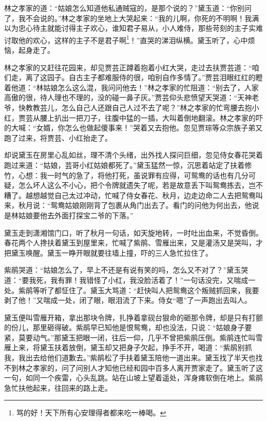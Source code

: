 \documentclass[12pt,oneside]{book}
\begin{document}
林之孝家的道：“姑娘怎么知道他私通贼寇的，是那个说的？”黛玉道：“你别问了，我不会说的。”林之孝家的坐地上大哭起来：“我的儿啊，你死的不明啊！我满以为忠心待主就能讨得主子欢心，谁知君子易从，小人难侍，那些苛刻的主子实难讨取他的欢心，这样的主子不是君子啊\footnote{骂的好！天下所有心安理得者都来吃一棒喝。}！”直哭的涕泪纵横。黛玉听了，心中烦恼，起身走了。

林之孝家的又赶往花园来，却见贾芸正蹲着抱着小红大哭，走过去扶贾芸道：“咱们走，离了这园子。自古主子都难服侍的很，咱别自作多情了。”贾芸泪眼红红的瞪着他道：“林姑娘怎么这么混，我问问他去！”林之孝家的忙阻道：“别去了，人家高傲的很，待人理也不理的，没的碰一鼻子灰。”贾芸仰头悲愤望天哭道：“天神老爷，快教教芸儿，怎么自己人还跟自己人过不去了呢？”林之孝家的忙弯腰去抱小红，贾芸从腰上扒出一把刀子，往腹中猛的一插，大叫着倒地翻滚。林之孝家的吓的大喊：“女婿，你怎么也做起傻事来！”哭着又去抱他。忽见贾琮等众宗族子弟又跑了过来，将贾芸、小红抬走了。

却说黛玉在房里心乱如丝，理不清个头绪，出外找人探问巨细，忽见侍女春花哭着跑过来道：“姑娘，芸哥小红姑娘都死了。”黛玉猛然一惊，沉思着站定了扶着修竹，心想：我一时气的急了，将他打死，虽说罪有应得，可鸳鸯的话也有几分可疑，怎么坏人这么不小心，把个令牌就遗失了呢，若是故意丢下叫鸳鸯拣去，岂不糟了。越想越觉自己太过冲动，忙喊了侍女春花、秋月，边走边命二人去把鸳鸯叫来，秋月说：“鸳鸯姑娘刚刚背了包裹从角门出去了。看门的问他为何出去，他说是林姑娘要他去外面打探宝二爷的下落。”

黛玉走到潇湘馆门口，听了秋月一句话，如天旋地转，一时吐出血来，不觉昏倒。春花两个人搀扶着黛玉到屋里来，忙喊了紫鹃、雪雁出来，又是灌汤又是哭叫，才把黛玉唤醒。黛玉一睁开眼就要往墙上撞，吓的三人急忙拉住了。

紫鹃哭道：“姑娘怎么了，早上不还是有说有笑的吗，怎么又不对了？”黛玉哭道：“要我死，我有罪！我错怪了小红，我没脸活着了！”一句话没完，又喘成一处。紫鹃等听了都怔住了。黛玉大骂道：“赶快叫人把鸳鸯这个叛贼抓回来，我要剥了他！”又喘成一处，闭了眼，眼泪流了下来。侍女“嗯”了一声跑出去叫人。

黛玉便叫雪雁开箱，拿出那块令牌，扎挣着拿砚台狠命的砸那令牌，却是只有打颤的份儿，那里砸得破。紫鹃早已知他是恨鸳鸯，却也没法，只说：“姑娘身子要紧，莫要动气。”那黛玉把眼一闭，往后一仰，几乎不曾把紫鹃压倒。紫鹃连忙叫雪雁上来，将黛玉扶着放倒，黛玉却又把身子欠起，挣手不开，喝道：“紫鹃别抓我，我出去给他们道歉去。”紫鹃松了手扶着黛玉陪他一道出来。黛玉找了半天也找不到林之孝家的，问了问别人才知他已经和园中百多人离开贾家走了。黛玉听了这一句，如同一个疾雷，心头乱跳。站在山坡上望着遥处，浑身瘫软倒在地上。紫鹃急忙扶他起来，往回来的路上走。
\end{document}
